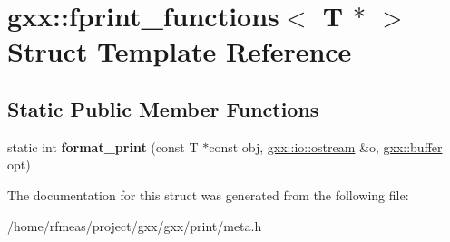 \hypertarget{structgxx_1_1fprint__functions_3_01T_01_5_01_4}{}\section{gxx\+:\+:fprint\+\_\+functions$<$ T $\ast$ $>$ Struct Template Reference}
\label{structgxx_1_1fprint__functions_3_01T_01_5_01_4}
\subsection*{Static Public Member Functions}
\begin{DoxyCompactItemize}
\item 
static int {\bfseries format\+\_\+print} (const T $\ast$const obj, \hyperlink{classgxx_1_1io_1_1ostream}{gxx\+::io\+::ostream} \&o, \hyperlink{classgxx_1_1buffer}{gxx\+::buffer} opt)\hypertarget{structgxx_1_1fprint__functions_3_01T_01_5_01_4_afb5f4f8483b05dadf3ba681c549bba3b}{}\label{structgxx_1_1fprint__functions_3_01T_01_5_01_4_afb5f4f8483b05dadf3ba681c549bba3b}

\end{DoxyCompactItemize}


The documentation for this struct was generated from the following file\+:\begin{DoxyCompactItemize}
\item 
/home/rfmeas/project/gxx/gxx/print/meta.\+h\end{DoxyCompactItemize}

